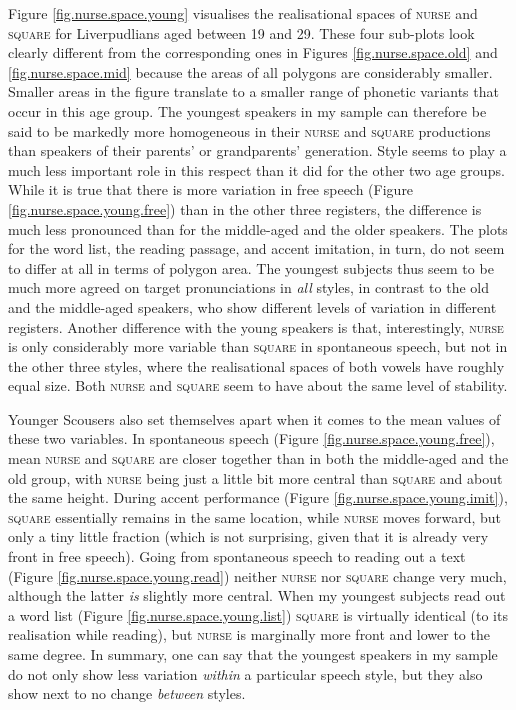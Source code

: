 Figure \ref{fig.nurse.space.young} visualises the realisational spaces of \textsc{nurse} and \textsc{square} for Liverpudlians aged between 19 and 29.
These four sub-plots look clearly different from the corresponding ones in Figures \ref{fig.nurse.space.old} and \ref{fig.nurse.space.mid} because the areas of all polygons are considerably smaller.
Smaller areas in the figure translate to a smaller range of phonetic variants that occur in this age group.
The youngest speakers in my sample can therefore be said to be markedly more homogeneous in their \textsc{nurse} and \textsc{square} productions than speakers of their parents' or grandparents' generation.
Style seems to play a much less important role in this respect than it did for the other two age groups.
While it is true that there is more variation in free speech (Figure \ref{fig.nurse.space.young.free}) than in the other three registers, the difference is much less pronounced than for the middle-aged and the older speakers.
The plots for the word list, the reading passage, and accent imitation, in turn, do not seem to differ at all in terms of polygon area.
The youngest subjects thus seem to be much more agreed on target pronunciations in \emph{all} styles, in contrast to the old and the middle-aged speakers, who show different levels of variation in different registers.
Another difference with the young speakers is that, interestingly, \textsc{nurse} is only considerably more variable than \textsc{square} in spontaneous speech, but not in the other three styles, where the realisational spaces of both vowels have roughly equal size.
Both \textsc{nurse} and \textsc{square} seem to have about the same level of stability.

Younger Scousers also set themselves apart when it comes to the mean values of these two variables.
In spontaneous speech (Figure \ref{fig.nurse.space.young.free}), mean \textsc{nurse} and \textsc{square} are closer together than in both the middle-aged and the old group, with \textsc{nurse} being just a little bit more central than \textsc{square} and about the same height.
During accent performance (Figure \ref{fig.nurse.space.young.imit}), \textsc{square} essentially remains in the same location, while \textsc{nurse} moves forward, but only a tiny little fraction (which is not surprising, given that it is already very front in free speech).
Going from spontaneous speech to reading out a text (Figure \ref{fig.nurse.space.young.read}) neither \textsc{nurse} nor \textsc{square} change very much, although the latter \emph{is} slightly more central.
When my youngest subjects read out a word list (Figure \ref{fig.nurse.space.young.list}) \textsc{square} is virtually identical (to its realisation while reading), but \textsc{nurse} is marginally more front and lower to the same degree.
In summary, one can say that the youngest speakers in my sample do not only show less variation \emph{within} a particular speech style, but they also show next to no change \emph{between} styles.

